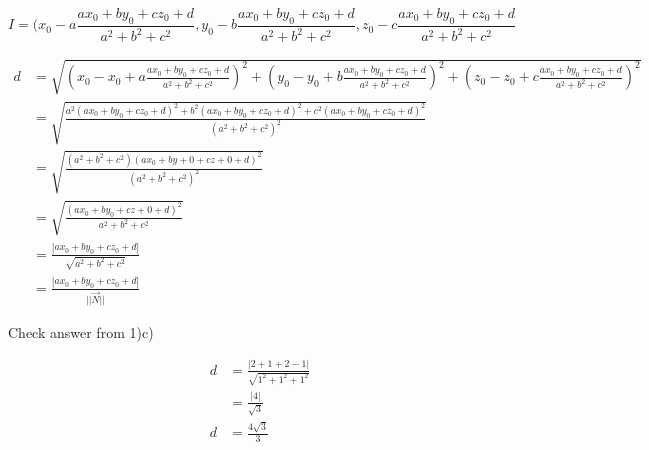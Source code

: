 \documentclass{article}
\begin{document}
$$
I = (x_0-a\frac{ax_0 + by_0 + cz_0 + d}{a^2 + b^2 + c^2}, y_0-b\frac{ax_0 + by_0 + cz_0 + d}{a^2 + b^2 + c^2}, z_0-c\frac{ax_0 + by_0 + cz_0 + d}{a^2 + b^2 + c^2}
$$

\begin{align*}
d &= \sqrt{(x_0 - x_0 + a\frac{ax_0 + by_0 + cz_0 + d}{a^2 + b^2 + c^2})^2 + (y_0 - y_0 + b\frac{ax_0 + by_0 + cz_0 + d}{a^2 + b^2 + c^2})^2 + (z_0 - z_0 + c\frac{ax_0 + by_0 + cz_0 + d}{a^2 + b^2 + c^2})^2} \\
&= \sqrt{\frac{a^2(ax_0+by_0+cz_0+d)^2 + b^2(ax_0+by_0+cz_0+d)^2 + c^2(ax_0+by_0+cz_0+d)^2}{(a^2 + b^2 + c^2)^2}} \\
&= \sqrt{\frac{(a^2 + b^2 + c^2)(ax_0+by+0+cz+0+d)^2}{(a^2 + b^2 + c^2)^2}} \\
&= \sqrt{\frac{(ax_0 + by_0 + cz+0 +d)^2}{a^2 + b^2 + c^2}} \\
&= \frac{|ax_0 + by_0 + cz_0 + d|}{\sqrt{a^2+b^2+c^2}} \\
&= \frac{|ax_0 + by_0 + cz_0 + d|}{||\vec{N}||}
\end{align*}

\begin{text}
\newline
Check answer from 1)c)
\end{text}

\begin{align*}
d &= \frac{| 2 + 1 + 2 - 1 |}{\sqrt{1^2 + 1^2 + 1^2}} \\
&= \frac{| 4 |}{\sqrt{3}} \\
d &= \frac{4\sqrt{3}}{3}
\end{align*}

\end{document}
